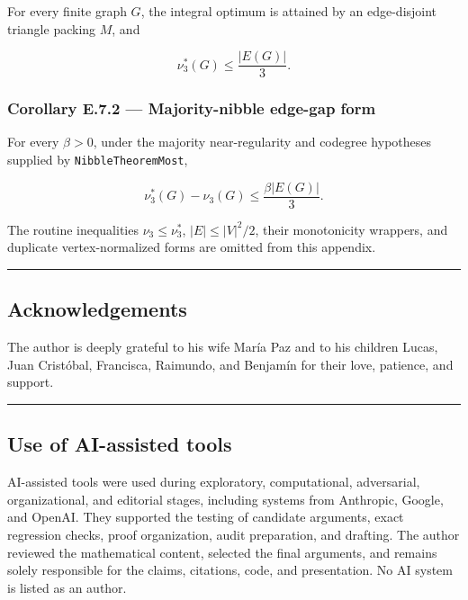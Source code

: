 \documentclass[english,11pt,a4paper]{article}
\begin{document}
For every finite graph \(G\), the integral optimum is attained by an
edge-disjoint triangle packing \(M\), and

\[
\nu_3^*(G)\le\frac{|E(G)|}{3}.
\]

\subsubsection{Corollary E.7.2 --- Majority-nibble edge-gap
form}\label{corollary-e.7.2-majority-nibble-edge-gap-form}

For every \(\beta>0\), under the majority near-regularity and codegree
hypotheses supplied by \nolinkurl{NibbleTheoremMost},

\[
\nu_3^*(G)-\nu_3(G)
\le
\frac{\beta|E(G)|}{3}.
\]

The routine inequalities \(\nu_3\le\nu_3^*\), \(|E|\le|V|^2/2\), their
monotonicity wrappers, and duplicate vertex-normalized forms are omitted
from this appendix.

\begin{center}\rule{0.5\linewidth}{0.5pt}\end{center}

\subsection{Acknowledgements}\label{acknowledgements}

The author is deeply grateful to his wife María Paz and to his children
Lucas, Juan Cristóbal, Francisca, Raimundo, and Benjamín for their love,
patience, and support.

\begin{center}\rule{0.5\linewidth}{0.5pt}\end{center}

\subsection{Use of AI-assisted tools}\label{use-of-ai-assisted-tools}

AI-assisted tools were used during exploratory, computational,
adversarial, organizational, and editorial stages, including systems
from Anthropic, Google, and OpenAI. They supported the testing of
candidate arguments, exact regression checks, proof organization, audit
preparation, and drafting. The author reviewed the mathematical content,
selected the final arguments, and remains solely responsible for the
claims, citations, code, and presentation. No AI system is listed as an
author.
\end{document}
